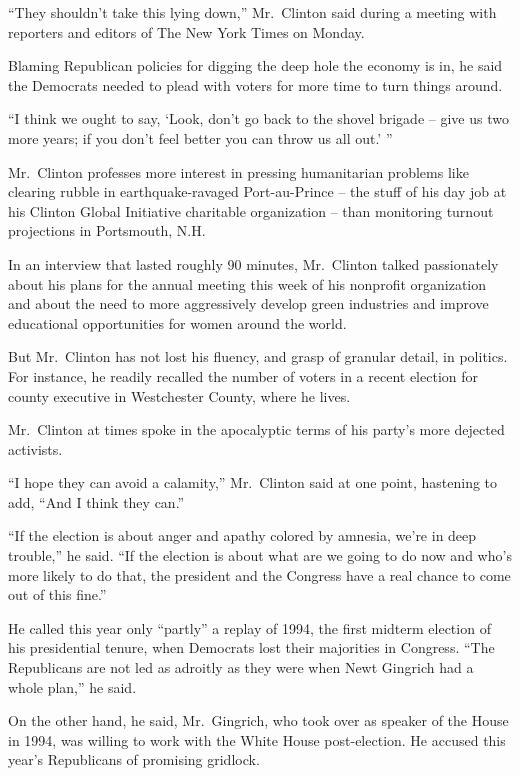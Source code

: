 ﻿\documentclass[12pt]{article}
\begin{document}
``They shouldn't take this lying down,'' Mr.~Clinton said during a meeting with reporters and
editors of The New York Times on Monday.

Blaming Republican policies for digging the deep hole the economy is in, he said the Democrats
needed to plead with voters for more time to turn things around.

``I think we ought to say, `Look, don't go back to the shovel brigade -- give us two more years; if
you don't feel better you can throw us all out.' ''

Mr.~Clinton professes more interest in pressing humanitarian problems like clearing rubble in
earthquake-ravaged Port-au-Prince -- the stuff of his day job at his Clinton Global Initiative
charitable organization -- than monitoring turnout projections in Portsmouth, N.H.

In an interview that lasted roughly 90 minutes, Mr.~Clinton talked passionately about his plans for
the annual meeting this week of his nonprofit organization and about the need to more aggressively
develop green industries and improve educational opportunities for women around the world.

But Mr.~Clinton has not lost his fluency, and grasp of granular detail, in politics. For instance,
he readily recalled the number of voters in a recent election for county executive in Westchester
County, where he lives.

Mr.~Clinton at times spoke in the apocalyptic terms of his party's more dejected activists.

``I hope they can avoid a calamity,'' Mr.~Clinton said at one point, hastening to add, ``And I think
they can.''

``If the election is about anger and apathy colored by amnesia, we're in deep trouble,'' he said.
``If the election is about what are we going to do now and who's more likely to do that, the
president and the Congress have a real chance to come out of this fine.''

He called this year only ``partly'' a replay of 1994, the first midterm election of his presidential
tenure, when Democrats lost their majorities in Congress. ``The Republicans are not led as adroitly
as they were when Newt Gingrich had a whole plan,'' he said.

On the other hand, he said, Mr.~Gingrich, who took over as speaker of the House in 1994, was willing
to work with the White House post-election. He accused this year's Republicans of promising
gridlock.
\end{document}
